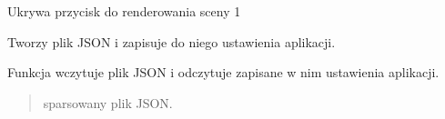 \documentclass[a4paper,10pt,openany,english]{sphinxmanual}
\begin{document}

\begin{fulllineitems}
\label{\detokenize{js/js-functions:hideButton}}
\pysigstartsignatures
\pysiglinewithargsret
{}
{}
{}
\pysigstopsignatures
\sphinxAtStartPar
Ukrywa przycisk do renderowania sceny 1

\end{fulllineitems}


\begin{fulllineitems}
\label{\detokenize{js/js-functions:createJSON}}
\pysigstartsignatures
\pysiglinewithargsret
{}
{}
{}
\pysigstopsignatures
\sphinxAtStartPar
Tworzy plik JSON i zapisuje do niego ustawienia aplikacji.

\end{fulllineitems}


\begin{fulllineitems}
\label{\detokenize{js/js-functions:loadJSON}}
\pysigstartsignatures
\pysiglinewithargsret
{}
{}
{}
\pysigstopsignatures
\sphinxAtStartPar
Funkcja wczytuje plik JSON i odczytuje zapisane w nim ustawienia aplikacji.
\begin{quote}\begin{description}
\sphinxAtStartPar
sparsowany plik JSON.

\end{description}\end{quote}

\end{fulllineitems}




\renewcommand{\indexname}{Index}
\printindex
\end{document}
